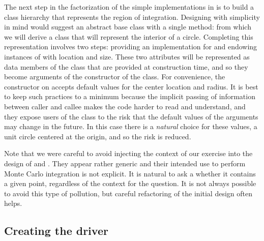 The next step in the factorization of the simple implementations in  is to build
a class hierarchy that represents the region of integration. Designing with simplicity in mind
would suggest an abstract base class  with a single method:
%
%
from which we will derive a class  that will represent the interior of a circle.
Completing this representation involves two steps: providing an implementation for
 and endowing instances of  with location and size. These two
attributes will be represented as data members of the class that are provided at construction
time, and so they become arguments of the constructor of the class.
%
%
For convenience, the constructor on  accepts default values for
the center location and radius. It is best to keep such practices to a minimum because the
implicit passing of information between caller and callee makes the code harder to read and
understand, and they expose users of the class  to the risk that the default
values of the arguments may change in the future. In this case there is a {\em natural} choice
for these values, a unit circle centered at the origin, and so the risk is reduced.

Note that we were careful to avoid injecting the context of our exercise into the design of
 and . They appear rather generic and their intended use to perform
Monte Carlo integration is not explicit. It is natural to ask a  whether it
contains a given point, regardless of the context for the question. It is not always possible
to avoid this type of pollution, but careful refactoring of the initial design often helps. 

\subsection{Creating the driver}
\label{sec:classes:driver}

